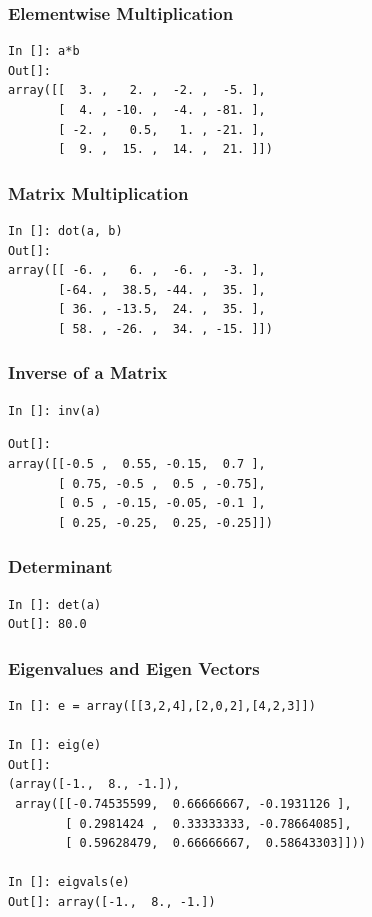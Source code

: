 \documentclass[14pt,compress]{beamer}
\begin{document}
\begin{frame}[fragile]
\frametitle{Elementwise Multiplication}
\begin{lstlisting}
In []: a*b
Out[]: 
array([[  3. ,   2. ,  -2. ,  -5. ],
       [  4. , -10. ,  -4. , -81. ],
       [ -2. ,   0.5,   1. , -21. ],
       [  9. ,  15. ,  14. ,  21. ]])

\end{lstlisting}
\end{frame}

\begin{frame}[fragile]
\frametitle{Matrix Multiplication}
\begin{lstlisting}
In []: dot(a, b)
Out[]: 
array([[ -6. ,   6. ,  -6. ,  -3. ],
       [-64. ,  38.5, -44. ,  35. ],
       [ 36. , -13.5,  24. ,  35. ],
       [ 58. , -26. ,  34. , -15. ]])
\end{lstlisting}
\end{frame}

\begin{frame}[fragile]
\frametitle{Inverse of a Matrix}
\begin{lstlisting}
In []: inv(a)
\end{lstlisting}
\begin{small}
\begin{lstlisting}
Out[]: 
array([[-0.5 ,  0.55, -0.15,  0.7 ],
       [ 0.75, -0.5 ,  0.5 , -0.75],
       [ 0.5 , -0.15, -0.05, -0.1 ],
       [ 0.25, -0.25,  0.25, -0.25]])
\end{lstlisting}
\end{small}
\end{frame}

\begin{frame}[fragile]
\frametitle{Determinant}
\begin{lstlisting}
In []: det(a)
Out[]: 80.0
\end{lstlisting}
\end{frame}

\begin{frame}[fragile]
\frametitle{Eigenvalues and Eigen Vectors}
\begin{small}
\begin{lstlisting}
In []: e = array([[3,2,4],[2,0,2],[4,2,3]])

In []: eig(e)
Out[]: 
(array([-1.,  8., -1.]),
 array([[-0.74535599,  0.66666667, -0.1931126 ],
        [ 0.2981424 ,  0.33333333, -0.78664085],
        [ 0.59628479,  0.66666667,  0.58643303]]))

In []: eigvals(e)
Out[]: array([-1.,  8., -1.])
\end{lstlisting}
\end{small}
\end{frame}
\end{document}
